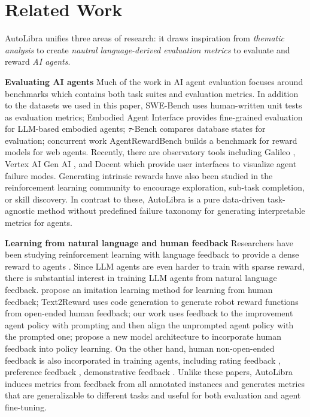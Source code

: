 \section{Related Work}
AutoLibra unifies three areas of research: it draws inspiration from \textit{thematic
analysis} to create \textit{nautral language-derived evaluation metrics} to evaluate
and reward \textit{AI agents}.

\noindent\textbf{Evaluating AI agents}
Much of the work in AI agent evaluation focuses around benchmarks which contains
both task suites and evaluation metrics. In addition to the datasets we used in
this paper, SWE-Bench \citep{jimenezswe} uses human-written unit tests as
evaluation metrics; Embodied Agent Interface \citep{li2024embodied} provides
fine-grained evaluation for LLM-based embodied agents; $\tau$-Bench \citep{yao2024tau}
compares database states for evaluation; concurrent work AgentRewardBench \citep{lù2025agentrewardbenchevaluatingautomaticevaluations}
builds a benchmark for reward models for web agents. Recently, there are
observatory tools including Galileo \citep{galileo_agentic}, Vertex AI Gen AI
\citep{google_agent_eval}, and Docent \citep{meng2025docent} which provide user interfaces
to visualize agent failure modes. Generating intrinsic rewards have also been
studied in the reinforcement learning community \citep{du2019liir,pathakICMl17curiosity,laskin2022cic}
to encourage exploration, sub-task completion, or skill discovery. In contrast
to these, AutoLibra is a pure data-driven task-agnostic method without predefined
failure taxonomy for generating interpretable metrics for agents.

\noindent\textbf{Learning from natural language and human feedback}
Researchers have been studying reinforcement learning with language feedback to
provide a dense reward to agents \citep{goyal2019using}. Since LLM agents are
even harder to train with sparse reward, there is substantial interest in training
LLM agents from natural language feedback. \citet{chen2024learning} propose an imitation
learning method for learning from human feedback; Text2Reward \citep{xietext2reward}
uses code generation to generate robot reward functions from open-ended human feedback;
our work \citep{chen2025fine} uses feedback to the improvement agent policy with
prompting and then align the unprompted agent policy with the prompted one;
\citet{shi2024yell} propose a new model architecture to incorporate human feedback
into policy learning. On the other hand, human non-open-ended feedback is also incorporated
in training agents, including rating feedback \citep{nguyen2017reinforcement},
preference feedback \citep{christiano2017deep}, demonstrative feedback \citep{shaikhaligning}.
Unlike these papers, AutoLibra induces metrics from feedback from all annotated instances
and generates metrics that are generalizable to different tasks and useful for both
evaluation and agent fine-tuning.

